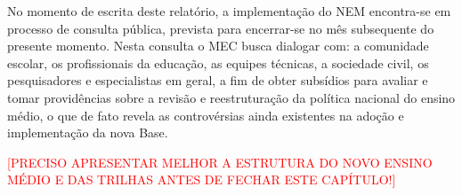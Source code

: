 No momento de escrita deste relatório, a implementação do \ac{NEM} encontra-se em processo de consulta pública, prevista para encerrar-se no mês subsequente do presente momento. Nesta consulta o \ac{MEC} busca dialogar com: a comunidade escolar, os profissionais da educação, as equipes técnicas, a sociedade civil, os pesquisadores e especialistas em geral, a fim de obter subsídios para avaliar e tomar providências sobre a revisão e reestruturação da política nacional do ensino médio, o que de fato revela as controvérsias ainda existentes na adoção e implementação da nova Base.

\textcolor{red}{[PRECISO APRESENTAR MELHOR A ESTRUTURA DO NOVO ENSINO MÉDIO E DAS TRILHAS ANTES DE FECHAR ESTE CAPÍTULO!]}


